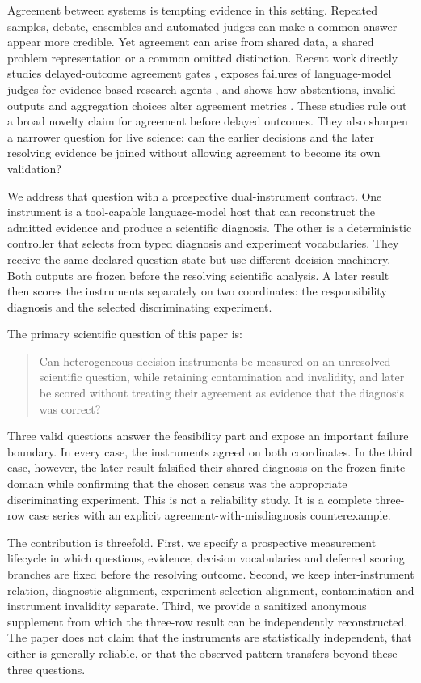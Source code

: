 \documentclass[10pt]{article}
\begin{document}
Agreement between systems is tempting evidence in this setting. Repeated samples, debate, ensembles and automated judges can make a common answer appear more credible. Yet agreement can arise from shared data, a shared problem representation or a common omitted distinction. Recent work directly studies delayed-outcome agreement gates \citep{chang2026valueblindbench}, exposes failures of language-model judges for evidence-based research agents \citep{wang2026reflect}, and shows how abstentions, invalid outputs and aggregation choices alter agreement metrics \citep{rao2026agreementmetrics}. These studies rule out a broad novelty claim for agreement before delayed outcomes. They also sharpen a narrower question for live science: can the earlier decisions and the later resolving evidence be joined without allowing agreement to become its own validation?

We address that question with a prospective dual-instrument contract. One instrument is a tool-capable language-model host that can reconstruct the admitted evidence and produce a scientific diagnosis. The other is a deterministic controller that selects from typed diagnosis and experiment vocabularies. They receive the same declared question state but use different decision machinery. Both outputs are frozen before the resolving scientific analysis. A later result then scores the instruments separately on two coordinates: the responsibility diagnosis and the selected discriminating experiment.

The primary scientific question of this paper is:

\begin{quote}
Can heterogeneous decision instruments be measured on an unresolved scientific question, while retaining contamination and invalidity, and later be scored without treating their agreement as evidence that the diagnosis was correct?
\end{quote}

Three valid questions answer the feasibility part and expose an important failure boundary. In every case, the instruments agreed on both coordinates. In the third case, however, the later result falsified their shared diagnosis on the frozen finite domain while confirming that the chosen census was the appropriate discriminating experiment. This is not a reliability study. It is a complete three-row case series with an explicit agreement-with-misdiagnosis counterexample.

The contribution is threefold. First, we specify a prospective measurement lifecycle in which questions, evidence, decision vocabularies and deferred scoring branches are fixed before the resolving outcome. Second, we keep inter-instrument relation, diagnostic alignment, experiment-selection alignment, contamination and instrument invalidity separate. Third, we provide a sanitized anonymous supplement from which the three-row result can be independently reconstructed. The paper does not claim that the instruments are statistically independent, that either is generally reliable, or that the observed pattern transfers beyond these three questions.
\end{document}
